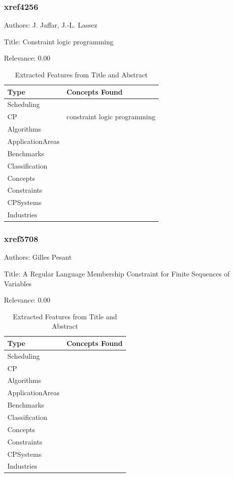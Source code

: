 \subsubsection{xref4256}
\label{mw:xref4256}

Authors: J. Jaffar, J.-L. Lassez

Title: Constraint logic programming

Relevance:  0.00

{\scriptsize
\begin{longtable}{p{2cm}p{20cm}}
\caption{Extracted Features from Title and Abstract}\\ \toprule
Type & Concepts Found\\ \midrule
\endhead
\bottomrule
\endfoot
Scheduling & \\ 
CP & constraint logic programming\\ 
Algorithms & \\ 
ApplicationAreas & \\ 
Benchmarks & \\ 
Classification & \\ 
Concepts & \\ 
Constraints & \\ 
CPSystems & \\ 
Industries & \\ 
\end{longtable}
}



\subsubsection{xref5708}
\label{mw:xref5708}

Authors: Gilles Pesant

Title: A Regular Language Membership Constraint for Finite Sequences of Variables

Relevance:  0.00

{\scriptsize
\begin{longtable}{p{2cm}p{20cm}}
\caption{Extracted Features from Title and Abstract}\\ \toprule
Type & Concepts Found\\ \midrule
\endhead
\bottomrule
\endfoot
Scheduling & \\ 
CP & \\ 
Algorithms & \\ 
ApplicationAreas & \\ 
Benchmarks & \\ 
Classification & \\ 
Concepts & \\ 
Constraints & \\ 
CPSystems & \\ 
Industries & \\ 
\end{longtable}
}



